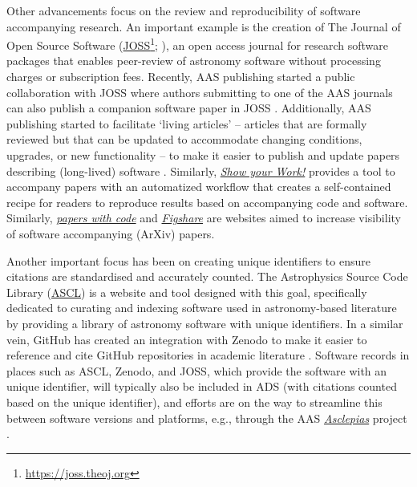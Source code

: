 \documentclass[twocolumn,linenumbers]{aastex631}
\begin{document}
Other advancements focus on the review and reproducibility of software accompanying research. An important example is the creation of The Journal of Open Source Software (\href{https://joss.theoj.org}{JOSS}\footnote{\url{https://joss.theoj.org}}; \citealt{arfon_2020_4316639}), an open access journal for research software packages that enables peer-review of astronomy software without processing charges or subscription fees. Recently, AAS publishing started a public collaboration with JOSS where authors submitting to one of the AAS journals can also publish a companion software paper in JOSS \citep{vishniac2018cooperative}. Additionally, AAS publishing started to facilitate `living articles' --  articles that are formally reviewed but that can be updated to accommodate changing conditions, upgrades, or new functionality --  to make it easier to publish and update papers describing (long-lived) software \citep{vishniac2018living}.
Similarly, \href{https://show-your.work/en/latest/}{\textit{Show your Work!}} \citep{Luger2021} provides a tool to accompany papers with an automatized workflow that creates a self-contained recipe for readers to reproduce results based on accompanying code and software. %
Similarly, \href{https://paperswithcode.com/about}{\textit{papers with code}}  and \href{https://figshare.com/}{\textit{Figshare}} are websites aimed to increase visibility of software accompanying (ArXiv) papers.  %

Another important focus has been on creating unique identifiers to ensure citations are standardised and accurately counted. The Astrophysics Source Code Library (\href{https://ascl.net/}{ASCL}) is a website and tool designed with this goal, specifically dedicated to curating and indexing software used in astronomy-based literature by providing a library of astronomy software with unique identifiers. 
In a similar vein, GitHub has created an integration with Zenodo to make it easier to reference and cite GitHub repositories in academic literature \citep{github_software_policy}. 
Software records in places such as ASCL, Zenodo, and JOSS, which provide the software with an unique identifier, will typically also be included in ADS (with citations counted based on the unique identifier), and efforts are on the way to streamline this between software versions and platforms, e.g., through the AAS \href{https://journals.aas.org/news/asclepias_aas233/}{\textit{Asclepias}} project \citep[][]{nielsen_2018_1283381, vandeSandt:2019, Henneken2022Asclepias}.
\end{document}
